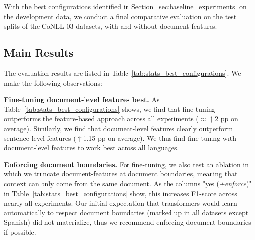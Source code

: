 With the best configurations identified in Section~\ref{sec:baseline_experiments} on the development data,    
we conduct a final comparative evaluation on the test splits of the CoNLL-03 datasets, with and without document features.

\subsection{Main Results}

\vspace{-1mm}
The evaluation results are listed in Table~\ref{tab:stats_best_configurations}. We make the following observations:
 

\begin{table}
\centering
{}
\vspace{-2mm}
\caption{Relative change in F1 for different entity types and languages when adding document-level features.}
\label{tab:comparison_context_vs_no_context}
\vspace{-2mm}
\end{table}

\noindent
\textbf{Fine-tuning document-level features best.} As Table~\ref{tab:stats_best_configurations} shows, we find that fine-tuning outperforms the feature-based approach across all experiments ($\approx \uparrow$2 pp on average). 
Similarly, we find that document-level features clearly outperform sentence-level features ($\uparrow$1.15 pp on average). We thus find fine-tuning with document-level features to work best across all languages. 

\noindent
\textbf{Enforcing document boundaries.} For fine-tuning, we also test an ablation in which we truncate document-features at document boundaries, meaning that context can only come from the same document. As the columns "yes (\textit{+enforce})" in Table~\ref{tab:stats_best_configurations} show, this increases F1-score across nearly all experiments. Our initial expectation that transformers would learn automatically to respect document boundaries (marked up in all datasets except Spanish) did not materialize, thus we recommend enforcing document boundaries if possible.

